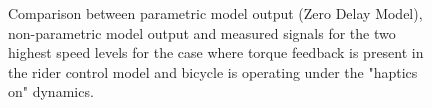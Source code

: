  \begin{figure}
    \centering
    \begin{subfigure}[b]{\textwidth}
        \centering
        \caption{}
        \label{fig:zdm_fit3}
    \end{subfigure}
    \begin{subfigure}[b]{\textwidth}
        \centering
        \caption{}
        \label{fig:zdm_fit4}
    \end{subfigure}
    
    \caption{Comparison between parametric model output (Zero Delay Model), non-parametric model output and measured signals for the two highest speed levels for the case where torque feedback is present in the rider control model and bicycle is operating under the "haptics on" dynamics.}
    \label{fig:zdm_fitB}
 \end{figure}
